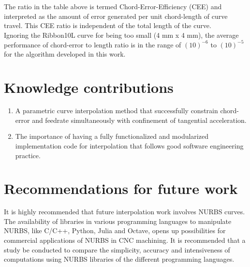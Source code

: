 \noindent
The ratio in the table above is termed Chord-Error-Efficiency (CEE) and interpreted as the amount of error generated per unit chord-length of curve travel. This CEE ratio is independent of the total length of the curve. \\

Ignoring the Ribbon10L curve for being too small (4 mm x 4 mm), the average performance of chord-error to length ratio is in the range of $(10)^{-6}$ to $(10)^{-5}$ for the algorithm developed in this work. 


		
\clearpage
\pagebreak

\section{Knowledge contributions}

\begin{enumerate}
	\item A parametric curve interpolation method that successfully constrain chord-error and feedrate simultaneously with confinement of tangential acceleration.
	
	\item The importance of having a fully functionalized and modularized implementation code for interpolation that follows good software engineering practice.   
	
\end{enumerate}


\section{Recommendations for future work}

It is highly recommended that future interpolation work involves NURBS curves. The availability of libraries in various programming languages to manipulate NURBS, like C/C++, Python, Julia and Octave, opens up possibilities for commercial applications of NURBS in CNC machining. It is recommended that a study be conducted to compare the simplicity, accuracy and intensiveness of computations using NURBS libraries of the different programming languages.  





\cleardoublepage

